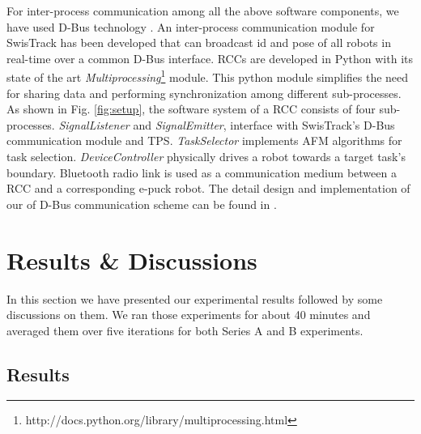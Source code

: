 \documentclass[smallcondensed]{svjour3}
\begin{document}
For inter-process communication among all the above software components, we have used D-Bus technology \citep{Pennington+2010}. An inter-process communication module for SwisTrack has been developed that can broadcast id and pose of all robots in real-time over a common D-Bus interface. RCCs are developed in Python with its state of the art \textit{Multiprocessing}\footnote{http://docs.python.org/library/multiprocessing.html} module. This python module simplifies the need for  sharing data and performing synchronization among different sub-processes. As shown in Fig. \ref{fig:setup}, the software system of a RCC consists of four sub-processes. {\em SignalListener} and {\em SignalEmitter}, interface with SwisTrack's D-Bus communication module and TPS. {\em TaskSelector} implements AFM algorithms for task selection. {\em DeviceController} physically drives a robot towards a target task's boundary. Bluetooth radio link is used as a communication medium between a RCC and a corresponding e-puck robot. The detail design and implementation of our of D-Bus communication scheme can be found in \cite{Sarker2010control}. 
\section{Results \& Discussions}
\label{sec:res}
In this section we have presented our experimental results followed by some discussions on them. We ran those experiments for about 40 minutes and averaged them over five iterations for both Series A and B experiments.
\subsection{Results}
\end{document}
